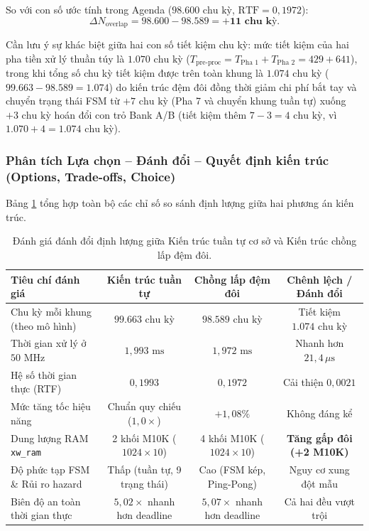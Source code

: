 So với con số ước tính trong Agenda ($98.600\text{ chu kỳ}$, $\text{RTF} = 0{,}1972$):
\begin{equation}
    \Delta N_{\text{overlap}} = 98.600 - 98.589 = \mathbf{+11\text{ chu kỳ}}.
\end{equation}

Cần lưu ý sự khác biệt giữa hai con số tiết kiệm chu kỳ: mức tiết kiệm của hai pha tiền xử lý thuần túy là $1.070\text{ chu kỳ}$ ($T_{\text{pre-proc}} = T_{\text{Pha 1}} + T_{\text{Pha 2}} = 429 + 641$), trong khi tổng số chu kỳ tiết kiệm được trên toàn khung là $1.074\text{ chu kỳ}$ ($99.663 - 98.589 = 1.074$) do kiến trúc đệm đôi đồng thời giảm chi phí bắt tay và chuyển trạng thái FSM từ $+7\text{ chu kỳ}$ (Pha 7 và chuyển khung tuần tự) xuống $+3\text{ chu kỳ}$ hoán đổi con trỏ Bank A/B (tiết kiệm thêm $7 - 3 = 4\text{ chu kỳ}$, vì $1.070 + 4 = 1.074\text{ chu kỳ}$).

\subsubsection*{Phân tích Lựa chọn -- Đánh đổi -- Quyết định kiến trúc (Options, Trade-offs, Choice)}
Bảng \ref{tab:ch12_overlap_tradeoff} tổng hợp toàn bộ các chỉ số so sánh định lượng giữa hai phương án kiến trúc.

\begin{table}[htbp]
\centering
\small
\caption{Đánh giá đánh đổi định lượng giữa Kiến trúc tuần tự cơ sở và Kiến trúc chồng lấp đệm đôi.}
\label{tab:ch12_overlap_tradeoff}
\begin{tabularx}{\linewidth}{|X|c|c|c|}
\hline
\textbf{Tiêu chí đánh giá} & \textbf{Kiến trúc tuần tự} & \textbf{Chồng lấp đệm đôi} & \textbf{Chênh lệch / Đánh đổi} \\
\hline
Chu kỳ mỗi khung (theo mô hình) & $99.663\text{ chu kỳ}$ & $98.589\text{ chu kỳ}$ & Tiết kiệm $1.074\text{ chu kỳ}$ \\
Thời gian xử lý ở $50\text{ MHz}$ & $1{,}993\text{ ms}$ & $1{,}972\text{ ms}$ & Nhanh hơn $21{,}4\,\mu\text{s}$ \\
Hệ số thời gian thực (RTF) & $0{,}1993$ & $0{,}1972$ & Cải thiện $0{,}0021$ \\
Mức tăng tốc hiệu năng & Chuẩn quy chiếu ($1{,}0\times$) & $+1{,}08\%$ & Không đáng kể \\
Dung lượng RAM \texttt{xw\_ram} & 2 khối M10K ($1024 \times 10$) & 4 khối M10K ($1024 \times 10$) & \textbf{Tăng gấp đôi (+2 M10K)} \\
Độ phức tạp FSM \& Rủi ro hazard & Thấp (tuần tự, 9 trạng thái) & Cao (FSM kép, Ping-Pong) & Nguy cơ xung đột mẫu \\
Biên độ an toàn thời gian thực & $5{,}02\times$ nhanh hơn deadline & $5{,}07\times$ nhanh hơn deadline & Cả hai đều vượt trội \\
\hline
\end{tabularx}
\end{table}

